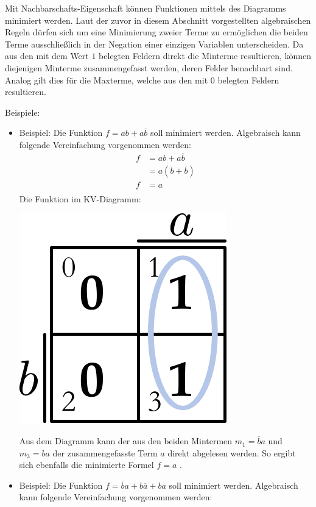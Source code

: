 \documentclass[11pt,a4paper]{scrreprt}
\begin{document}
Mit Nachbarschafts-Eigenschaft können Funktionen mittels des Diagramms minimiert werden. Laut der zuvor in diesem Abschnitt vorgestellten algebraischen Regeln dürfen sich um eine Minimierung zweier Terme zu ermöglichen die beiden Terme ausschließlich in der Negation einer einzigen Variablen unterscheiden. Da aus den mit dem Wert $1$ belegten Feldern direkt die Minterme resultieren, können diejenigen Minterme zusammengefasst werden, deren Felder benachbart sind. Analog gilt dies für die Maxterme, welche aus den mit $0$ belegten Feldern resultieren. 

Beispiele:
\begin{itemize}
	\item
		Beispiel: Die Funktion $f = ab + a\overline{b}$ soll minimiert werden. Algebraisch kann folgende Vereinfachung vorgenommen werden:
		\begin{align*}
			f &= ab + a\overline{b}  \\
			  &= a(b + \overline{b}) \\
			f &= a                   \\
		\end{align*}
		Die Funktion im KV-Diagramm:
		\begin{center}
			{\includegraphics[scale = 0.5]{KV2diagramm_belegt.pdf}}
		\end{center}
		Aus dem Diagramm kann der aus den beiden Mintermen $m_1 = \overline{b}a$ und $m_3 = ba$ der zusammengefasste Term $a$ direkt abgelesen werden. So ergibt sich ebenfalls die minimierte Formel $f = a$ .
	\item
		Beispiel: Die Funktion $f = \overline{b}a + b\overline{a} + ba$ soll minimiert werden. Algebraisch kann folgende Vereinfachung vorgenommen werden:

\end{itemize}
\end{document}
